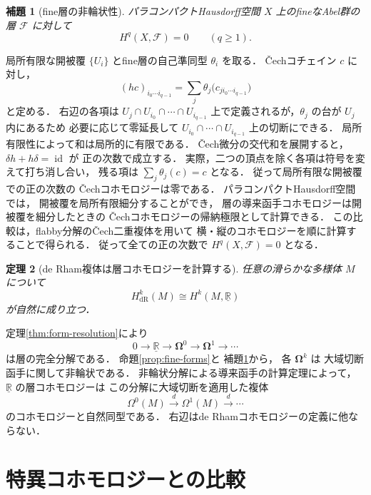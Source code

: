 \documentclass[a5paper,10pt,onecolumn]{jsarticle}
\makeatletter
\theoremstyle{mathnotetheorem}
\newtheorem{theorem}{定理}[section]
\newtheorem{lemma}[theorem]{補題}
\renewcommand{\proofname}{証明}
\renewenvironment{proof}[1][\proofname]{%
  \par\pushQED{\qed}\normalfont\topsep4\p@\@plus2\p@\relax
  \trivlist\item[\hskip\labelsep\bfseries #1]\ignorespaces
}{\popQED\endtrivlist\@endpefalse}
\makeatother
\begin{document}
\begin{lemma}[fine層の非輪状性]\label{lem:fine-acyclic}
パラコンパクトHausdorff空間 $X$ 上のfineなAbel群の層
$\mathcal F$ に対して
\[
 H^q(X,\mathcal F)=0\qquad(q\ge1).
\]
\end{lemma}
\begin{proof}
局所有限な開被覆 $\{U_i\}$ とfine層の自己準同型
$\theta_i$ を取る．
\v Cechコチェイン $c$ に対し，
\[
 (hc)_{i_0\cdots i_{q-1}}
 =\sum_j\theta_j
 \bigl(c_{j i_0\cdots i_{q-1}}\bigr)
\]
と定める．
右辺の各項は $U_j\cap U_{i_0}\cap\cdots\cap U_{i_{q-1}}$
上で定義されるが，$\theta_j$ の台が $U_j$ 内にあるため
必要に応じて零延長して
$U_{i_0}\cap\cdots\cap U_{i_{q-1}}$ 上の切断にできる．
局所有限性によって和は局所的に有限である．
\v Cech微分の交代和を展開すると，
$\delta h+h\delta=\operatorname{id}$ が
正の次数で成立する．
実際，二つの頂点を除く各項は符号を変えて打ち消し合い，
残る項は $\sum_j\theta_j(c)=c$ となる．
従って局所有限な開被覆での正の次数の
\v Cechコホモロジーは零である．
パラコンパクトHausdorff空間では，
開被覆を局所有限細分することができ，
層の導来函手コホモロジーは開被覆を細分したときの
\v Cechコホモロジーの帰納極限として計算できる．
この比較は，flabby分解の\v Cech二重複体を用いて
横・縦のコホモロジーを順に計算することで得られる．
従って全ての正の次数で
$H^q(X,\mathcal F)=0$ となる．
\end{proof}

\begin{theorem}[de Rham複体は層コホモロジーを計算する]
\label{thm:de-rham-sheaf}
任意の滑らかな多様体 $M$ について
\[
 H_{\mathrm{dR}}^k(M)\cong
 H^k(M,\underline{\mathbb R})
\]
が自然に成り立つ．
\end{theorem}
\begin{proof}
定理\ref{thm:form-resolution}により
\[
 0\to\underline{\mathbb R}\to
 \boldsymbol\Omega^0\to\boldsymbol\Omega^1\to\cdots
\]
は層の完全分解である．
命題\ref{prop:fine-forms}と
補題\ref{lem:fine-acyclic}から，
各 $\boldsymbol\Omega^k$ は
大域切断函手に関して非輪状である．
非輪状分解による導来函手の計算定理によって，
$\underline{\mathbb R}$ の層コホモロジーは
この分解に大域切断を適用した複体
\[
 \Omega^0(M)\xrightarrow d\Omega^1(M)\xrightarrow d\cdots
\]
のコホモロジーと自然同型である．
右辺はde Rhamコホモロジーの定義に他ならない．
\end{proof}

\section{特異コホモロジーとの比較}
\end{document}
